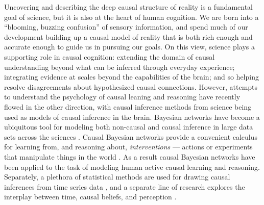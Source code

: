 \documentclass{cambridge7A}%
\newcommand{\sntodo}[2][]{\todo[caption={\textbf{NB}}, size=\footnotesize, color = aliceblue, #1]{#2}~}
\begin{document}
Uncovering and describing the deep causal structure of reality is a fundamental goal of science, but it is also at the heart of human cognition.  We are born into a ``blooming, buzzing confusion'' \citep[p. 462]{james1890principles} of sensory information, and spend much of our development building up a causal model of reality that is both rich enough and accurate enough to guide us in pursuing our goals. On this view, science plays a supporting role in causal cognition: extending the domain of causal understanding beyond what can be inferred through everyday experience; integrating evidence at scales beyond the capabilities of the brain; and so helping resolve disagreements about hypothesized causal connections.  However, attempts to understand the psychology of causal leaning and reasoning have recently flowed in the other direction, with causal inference methods from science being used as models of causal inference in the brain. Bayesian networks have become a ubiquitous tool for modeling both non-causal and causal inference in large data sets across the sciences \citep{pearl1988probabilistic}.  Causal Bayesian networks provide a convenient calculus for learning from, and reasoning about, \emph{interventions} --- actions or experiments that manipulate things in the world \citep{pearl2000causality,woodward2003making}.  As a result causal Bayesian networks have been applied to the task of modeling human active causal learning and reasoning.  Separately, a plethora of statistical methods are used for drawing causal inferences from time series data \citep{friston2014granger,granger2004time}, and a separate line of research explores the interplay between time, causal beliefs, and perception \citep[e.g.,][]{buehner2006temporal,bechlivanidis2016time}.%
\end{document}
